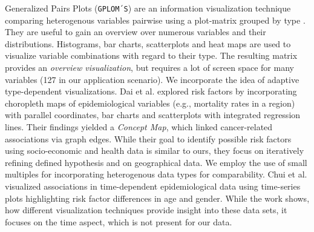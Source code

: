 \documentclass[journal]{style/vgtc} 			          %
\newcommand{\add}[1]{\textcolor{blue}{\uline{#1}}}
\begin{document}
Generalized Pairs Plots (\texttt{GPLOM´S}) are an information visualization technique comparing heterogenous variables pairwise using a plot-matrix grouped by type \cite{GPLOMS, Francois2013}.
%
They are useful to gain an overview over numerous variables and their distributions.
%
Histograms, bar charts, scatterplots and heat maps are used to visualize variable combinations with regard to their type.
%
The resulting matrix provides an \emph{overview visualization}, but requires a lot of screen space for many variables (127 in our application scenario).
%
%
%
We incorporate the idea of adaptive type-dependent visualizations.
%
Dai et al. \cite{Dai2005} explored risk factors by incorporating choropleth maps of epidemiological variables (e.g., mortality rates in a region) with parallel coordinates, bar charts and scatterplots with integrated regression lines.
%
Their findings yielded a \emph{Concept Map}, which linked cancer-related associations via graph edges.
%
While their goal to identify possible risk factors using socio-economic and health data is similar to ours, they focus on iteratively refining defined hypothesis and on geographical data.
%
We employ the use of small multiples for incorporating heterogenous data types for comparability.
%
Chui et al. \cite{Chui2011} visualized associations in time-dependent epidemiological data using time-series plots highlighting risk factor differences in age and gender.
%
While the work shows, how different visualization techniques provide insight into these data sets, it focuses on the time aspect, which is not present for our data.
%
\end{document}

